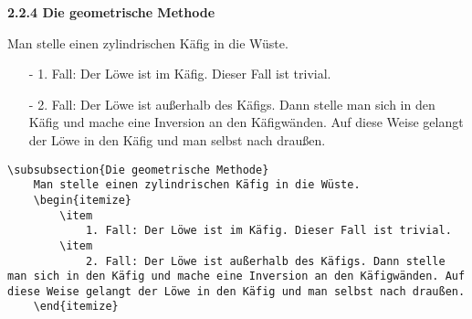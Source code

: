 \begin{frame}[fragile]
	\vspace{-0.2cm}
	\Losung
	\begin{outputbox}
		{\large\textbf{2.2.4 Die geometrische Methode}}
		
		Man stelle einen zylindrischen Käfig in die Wüste.
		\begin{itemize}
			\item[-]
			1. Fall: Der Löwe ist im Käfig. Dieser Fall ist trivial.
			\item[-]
			2. Fall: Der Löwe ist außerhalb des Käfigs. Dann stelle man sich in den Käfig und mache eine Inversion an den Käfigwänden. Auf diese Weise gelangt der Löwe in den Käfig und man selbst nach draußen.
		\end{itemize}
		\vspace{-0.2cm}
	\end{outputbox}

	\Code
	\vspace{-0.1cm}
	\begin{lstlisting}
\subsubsection{Die geometrische Methode}
	Man stelle einen zylindrischen Käfig in die Wüste.
	\begin{itemize}
		\item
			1. Fall: Der Löwe ist im Käfig. Dieser Fall ist trivial.
		\item
			2. Fall: Der Löwe ist außerhalb des Käfigs. Dann stelle man sich in den Käfig und mache eine Inversion an den Käfigwänden. Auf diese Weise gelangt der Löwe in den Käfig und man selbst nach draußen.
	\end{itemize}
	\end{lstlisting}
\end{frame}
